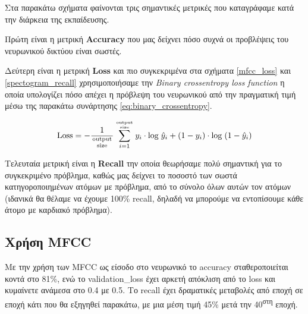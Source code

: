 \documentclass[../main.tex]{subfiles}
\begin{document}
Στα παρακάτω σχήματα φαίνονται τρις σημαντικές μετρικές που καταγράφαμε κατά την
διάρκεια της εκπαίδευσης.

Πρώτη είναι η μετρική \textbf{Accuracy} που μας δείχνει πόσο συχνά οι προβλέψεις
του νευρωνικού δικτύου είναι σωστές.

Δεύτερη είναι η μετρική \textbf{Loss} και πιο συγκεκριμένα στα σχήματα
\ref{mfcc_loss} και \ref{spectogram_recall} χρησιμοποιήσαμε την \textit{Binary
	crossentropy loss function} η οποία υπολογίζει πόσο απέχει η πρόβλεψη του
νευρωνικού από την πραγματική τιμή μέσω της παρακάτω συνάρτησης
\ref{eq:binary_crossentropy}.

\begin{equation}\label{eq:binary_crossentropy}
	\mathrm{Loss} = - \frac{1}{\mathrm{output \atop size}} \sum_{i=1}^{\mathrm{output \atop size}} y_i \cdot \mathrm{log}\; {\hat{y}}_i + (1-y_i) \cdot \mathrm{log}\; (1-{\hat{y}}_i)
\end{equation}

Τελευταία μετρική είναι η \textbf{Recall} την οποία θεωρήσαμε πολύ σημαντική για
το συγκεκριμένο πρόβλημα, καθώς μας δείχνει το ποσοστό των σωστά
κατηγοροποιημένων ατόμων με πρόβλημα, από το σύνολο όλων αυτών τον ατόμων
(ιδανικά θα θέλαμε να έχουμε 100\% recall, δηλαδή να μπορούμε να εντοπίσουμε
κάθε άτομο με καρδιακό πρόβλημα).

\subsection{Χρήση MFCC}

Με την χρήση των MFCC ως είσοδο στο νευρωνικό το accuracy σταθεροποιείται κοντά
στο 81\%, ενώ το validation\_loss έχει αρκετή απόκλιση από το loss και κυμαίνετε
ανάμεσα στο 0.4 με 0.5. Το recall έχει δραματικές μεταβολές από εποχή σε εποχή
κάτι που θα εξηγηθεί παρακάτω, με μια μέση τιμή 45\% μετά την
40\textsuperscript{στη} εποχή.
\end{document}

